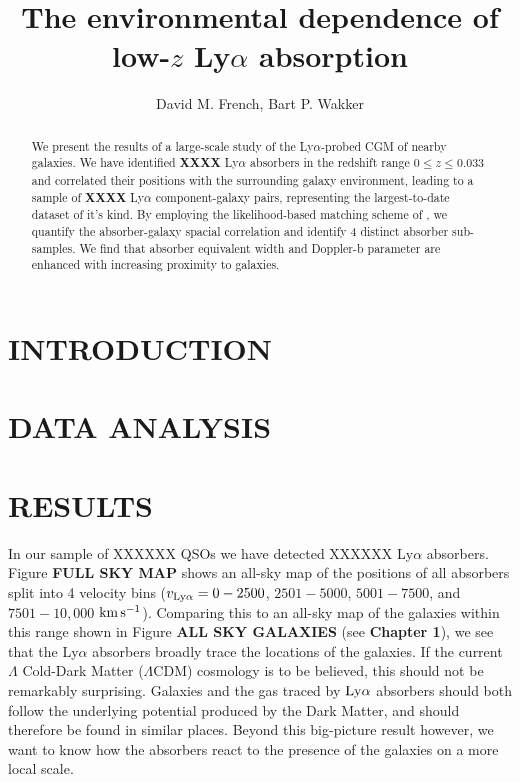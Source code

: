 \documentclass[twocolumn,tighten]{aastex62}
\newcommand{\kms}{$\rm km\, s^{-1}$}
\begin{document}
\title{The environmental dependence of low-$z$ Ly$\alpha$ absorption}


\author{David M. French, Bart P. Wakker}


\begin{abstract}
We present the results of a large-scale study of the Ly$\alpha$-probed CGM of nearby galaxies. We have identified \textbf{XXXX} Ly$\alpha$ absorbers in the redshift range $0 \leq z \leq 0.033$ and correlated their positions with the surrounding galaxy environment, leading to a sample of \textbf{XXXX} Ly$\alpha$ component-galaxy pairs, representing the largest-to-date dataset of it's kind. By employing the likelihood-based matching scheme of \cite{french2017}, we quantify the absorber-galaxy spacial correlation and identify 4 distinct absorber sub-samples. We find that absorber equivalent width and Doppler-b parameter are enhanced with increasing proximity to galaxies.

\end{abstract}




\section{INTRODUCTION}



\section{DATA ANALYSIS}


\section{RESULTS}

In our sample of XXXXXX QSOs we have detected XXXXXX Ly$\alpha$ absorbers. Figure \textbf{FULL SKY MAP} shows an all-sky map of the positions of all absorbers split into 4 velocity bins ($v_{\rm Ly\alpha} = 0 - 2500$, $2501 - 5000$, $5001 - 7500$, and $7501 - 10,000$ \kms). Comparing this to an all-sky map of the galaxies within this range shown in Figure \textbf{ALL SKY GALAXIES} (see \textbf{Chapter 1}), we see that the Ly$\alpha$ absorbers broadly trace the locations of the galaxies. If the current $\Lambda$ Cold-Dark Matter ($\Lambda$CDM) cosmology is to be believed, this should not be remarkably surprising. Galaxies and the gas traced by $\rm Ly\alpha$ absorbers should both follow the underlying potential produced by the Dark Matter, and should therefore be found in similar places. Beyond this big-picture result however, we want to know how the absorbers react to the presence of the galaxies on a more local scale.
\end{document}
